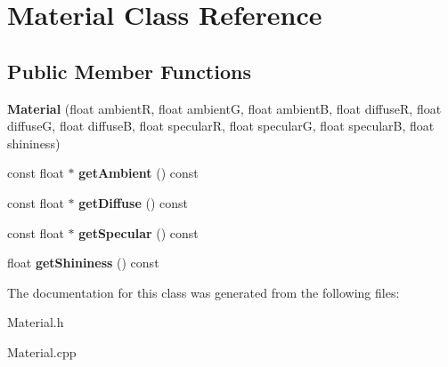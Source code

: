 \hypertarget{classMaterial}{}\section{Material Class Reference}
\label{classMaterial}
\subsection*{Public Member Functions}
\begin{DoxyCompactItemize}
\item 
\mbox{\label{classMaterial_a2bf199a73524b0aca5a6e26e1ae0ace1}} 
{\bfseries Material} (float ambientR, float ambientG, float ambientB, float diffuseR, float diffuseG, float diffuseB, float specularR, float specularG, float specularB, float shininess)
\item 
\mbox{\label{classMaterial_a2d0034a6d7ae6b48f6bd8f71d987f616}} 
const float $\ast$ {\bfseries get\+Ambient} () const
\item 
\mbox{\label{classMaterial_a17ca220df523f0eb422d54dbbebb5628}} 
const float $\ast$ {\bfseries get\+Diffuse} () const
\item 
\mbox{\label{classMaterial_a6b757c5b363b6b03784bb0f39b25b532}} 
const float $\ast$ {\bfseries get\+Specular} () const
\item 
\mbox{\label{classMaterial_ac65754d70c261b6065087fe3ce828872}} 
float {\bfseries get\+Shininess} () const
\end{DoxyCompactItemize}


The documentation for this class was generated from the following files\+:\begin{DoxyCompactItemize}
\item 
Material.\+h\item 
Material.\+cpp\end{DoxyCompactItemize}
